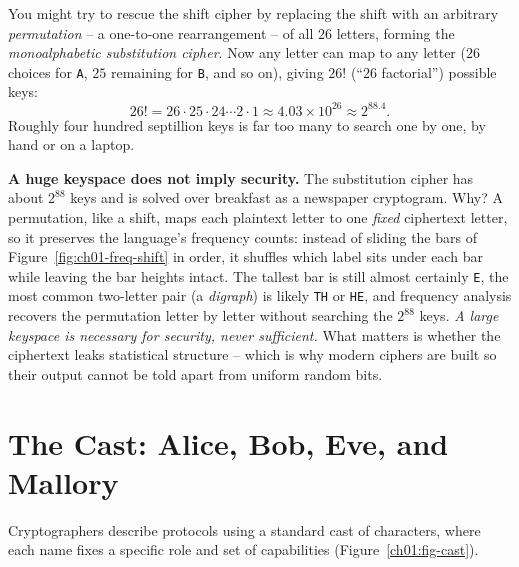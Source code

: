 You might try to rescue the shift cipher by replacing the shift with an arbitrary \emph{permutation} -- a one-to-one rearrangement -- of all $26$ letters, forming the \emph{monoalphabetic substitution cipher}. Now any letter can map to any letter ($26$ choices for \texttt{A}, $25$ remaining for \texttt{B}, and so on), giving $26!$ (``$26$ factorial'') possible keys:
\[
26! = 26 \cdot 25 \cdot 24 \cdots 2 \cdot 1 \approx 4.03 \times 10^{26} \approx 2^{88.4}.
\]
Roughly four hundred septillion keys is far too many to search one by one, by hand or on a laptop.

\begin{trapbox}
\textbf{A huge keyspace does not imply security.} The substitution cipher has about $2^{88}$ keys and is solved over breakfast as a newspaper cryptogram. Why? A permutation, like a shift, maps each plaintext letter to one \emph{fixed} ciphertext letter, so it preserves the language's frequency counts: instead of sliding the bars of Figure~\ref{fig:ch01-freq-shift} in order, it shuffles which label sits under each bar while leaving the bar heights intact. The tallest bar is still almost certainly \texttt{E}, the most common two-letter pair (a \emph{digraph}) is likely \texttt{TH} or \texttt{HE}, and frequency analysis recovers the permutation letter by letter without searching the $2^{88}$ keys. \emph{A large keyspace is necessary for security, never sufficient.} What matters is whether the ciphertext leaks statistical structure -- which is why modern ciphers are built so their output cannot be told apart from uniform random bits.
\end{trapbox}

\section{The Cast: Alice, Bob, Eve, and Mallory}
\label{ch01:cast}

Cryptographers describe protocols using a standard cast of characters, where each name fixes a specific role and set of capabilities (Figure~\ref{ch01:fig-cast}).

